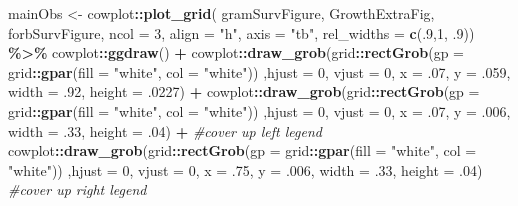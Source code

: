 \documentclass[
]{article}
\newenvironment{Shaded}{\begin{snugshade}}{\end{snugshade}}
\newcommand{\CommentTok}[1]{\textcolor[rgb]{0.56,0.35,0.01}{\textit{#1}}}
\newcommand{\DataTypeTok}[1]{\textcolor[rgb]{0.13,0.29,0.53}{#1}}
\newcommand{\DecValTok}[1]{\textcolor[rgb]{0.00,0.00,0.81}{#1}}
\newcommand{\FloatTok}[1]{\textcolor[rgb]{0.00,0.00,0.81}{#1}}
\newcommand{\KeywordTok}[1]{\textcolor[rgb]{0.13,0.29,0.53}{\textbf{#1}}}
\newcommand{\NormalTok}[1]{#1}
\newcommand{\OperatorTok}[1]{\textcolor[rgb]{0.81,0.36,0.00}{\textbf{#1}}}
\newcommand{\StringTok}[1]{\textcolor[rgb]{0.31,0.60,0.02}{#1}}
\begin{document}
\begin{Shaded}
\begin{Highlighting}[]
\NormalTok{mainObs \textless{}{-}}\StringTok{ }\NormalTok{cowplot}\OperatorTok{::}\KeywordTok{plot\_grid}\NormalTok{( gramSurvFigure, GrowthExtraFig, forbSurvFigure, }\DataTypeTok{ncol =} \DecValTok{3}\NormalTok{, }\DataTypeTok{align =} \StringTok{"h"}\NormalTok{, }\DataTypeTok{axis =} \StringTok{"tb"}\NormalTok{, }\DataTypeTok{rel\_widths =} \KeywordTok{c}\NormalTok{(.}\DecValTok{9}\NormalTok{,}\DecValTok{1}\NormalTok{, }\FloatTok{.9}\NormalTok{)) }\OperatorTok{\%\textgreater{}\%}\StringTok{ }
\StringTok{  }\NormalTok{cowplot}\OperatorTok{::}\KeywordTok{ggdraw}\NormalTok{() }\OperatorTok{+}\StringTok{ }
\StringTok{  }\NormalTok{cowplot}\OperatorTok{::}\KeywordTok{draw\_grob}\NormalTok{(grid}\OperatorTok{::}\KeywordTok{rectGrob}\NormalTok{(}\DataTypeTok{gp =}\NormalTok{ grid}\OperatorTok{::}\KeywordTok{gpar}\NormalTok{(}\DataTypeTok{fill =} \StringTok{"white"}\NormalTok{, }\DataTypeTok{col =} \StringTok{"white"}\NormalTok{)) ,}\DataTypeTok{hjust =} \DecValTok{0}\NormalTok{, }\DataTypeTok{vjust =} \DecValTok{0}\NormalTok{, }\DataTypeTok{x =} \FloatTok{.07}\NormalTok{, }\DataTypeTok{y =} \FloatTok{.059}\NormalTok{, }\DataTypeTok{width =} \FloatTok{.92}\NormalTok{, }\DataTypeTok{height =} \FloatTok{.0227}\NormalTok{) }\OperatorTok{+}
\StringTok{  }\NormalTok{cowplot}\OperatorTok{::}\KeywordTok{draw\_grob}\NormalTok{(grid}\OperatorTok{::}\KeywordTok{rectGrob}\NormalTok{(}\DataTypeTok{gp =}\NormalTok{ grid}\OperatorTok{::}\KeywordTok{gpar}\NormalTok{(}\DataTypeTok{fill =} \StringTok{"white"}\NormalTok{, }\DataTypeTok{col =} \StringTok{"white"}\NormalTok{)) ,}\DataTypeTok{hjust =} \DecValTok{0}\NormalTok{, }\DataTypeTok{vjust =} \DecValTok{0}\NormalTok{, }\DataTypeTok{x =} \FloatTok{.07}\NormalTok{, }\DataTypeTok{y =} \FloatTok{.006}\NormalTok{, }\DataTypeTok{width =} \FloatTok{.33}\NormalTok{, }\DataTypeTok{height =} \FloatTok{.04}\NormalTok{) }\OperatorTok{+}\StringTok{ }\CommentTok{\#cover up left legend }
\StringTok{  }\NormalTok{cowplot}\OperatorTok{::}\KeywordTok{draw\_grob}\NormalTok{(grid}\OperatorTok{::}\KeywordTok{rectGrob}\NormalTok{(}\DataTypeTok{gp =}\NormalTok{ grid}\OperatorTok{::}\KeywordTok{gpar}\NormalTok{(}\DataTypeTok{fill =} \StringTok{"white"}\NormalTok{, }\DataTypeTok{col =} \StringTok{"white"}\NormalTok{)) ,}\DataTypeTok{hjust =} \DecValTok{0}\NormalTok{, }\DataTypeTok{vjust =} \DecValTok{0}\NormalTok{, }\DataTypeTok{x =} \FloatTok{.75}\NormalTok{, }\DataTypeTok{y =} \FloatTok{.006}\NormalTok{, }\DataTypeTok{width =} \FloatTok{.33}\NormalTok{, }\DataTypeTok{height =} \FloatTok{.04}\NormalTok{) }\CommentTok{\#cover up right legend}


\end{Highlighting}
\end{Shaded}
\end{document}

